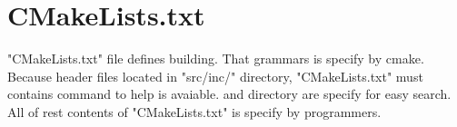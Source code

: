 \section{CMakeLists.txt}

\begin{crules}
\end{crules}

"CMakeLists.txt" file defines building. That grammars is specify by cmake.
Because header files located in "src/inc/" directory, "CMakeLists.txt" must
contains command  to help
 is avaiable.  and 
directory are specify for easy search. All of rest contents of "CMakeLists.txt"
is specify by programmers.

